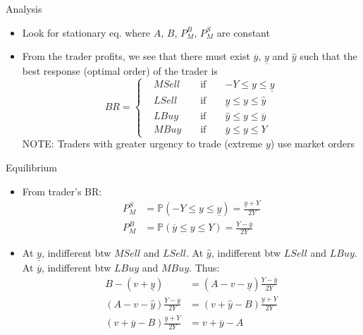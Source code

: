 \documentclass[english,10pt
,aspectratio=169
]{beamer}
\begin{document}
\begin{frame}{Analysis}
	\begin{itemize}
		\item Look for stationary eq. where  $A$, $B$, $P^B_M$, $P^S_M$ are constant 
		\item From the trader profits, we see that there must exist $\overline{y}$,  $\underline{y}$ and $\hat{y}$ such that the best response (optimal order) of the trader is
		\begin{equation*}
		BR=\left\{ \begin{aligned}
		&MSell		&& 	\text{ if } 	&&	-Y\le y \le \underline{y} \\
		&LSell 		&&	\text{ if } 	&&	\underline{y} \le y \le \hat{y} \\
		&LBuy		&&	\text{ if } 	&&	\hat{y} \le y \le \overline{y} \\
		&MBuy	&&	\text{ if } 	&&	\overline{y} \le y \le Y
		\end{aligned}
		\right.
		\end{equation*}
		NOTE: Traders with greater urgency to trade (extreme $y$) use market orders
	\end{itemize}
\end{frame}


\begin{frame}{Equilibrium}
	\begin{itemize}
		\item From trader's BR:
		\begin{align*}
		P^S_M 	&=\mathbb{P}(-Y\le y \le \underline{y})=\frac{\underline{y}+Y}{2Y} \\
		P^B_M 	&=\mathbb{P}(\overline{y} \le y \le Y)=\frac{Y-\overline{y}}{2Y}
		\end{align*}
		\item At $\underline{y}$, indifferent btw $MSell$ and $LSell$. At $\hat{y}$, indifferent btw $LSell$ and $LBuy$. At $\overline{y}$, indifferent btw $LBuy$ and $MBuy$. Thus:
		\begin{align}
		B-(v+\underline{y}) 					& = (A-v-\underline{y})\frac{Y-\overline{y}}{2Y} \label{eq1}\\
		(A-v-\hat{y}) \frac{Y-\overline{y}}{2Y} 			& = (v+\hat{y}-B)\frac{\underline{y}+Y}{2Y} \label{eq2}\\
		(v+\overline{y}-B) \frac{\underline{y}+Y}{2Y}  	& = v+\overline{y}-A \label{eq3}
		\end{align}
	\end{itemize}
\end{frame}
\end{document}
